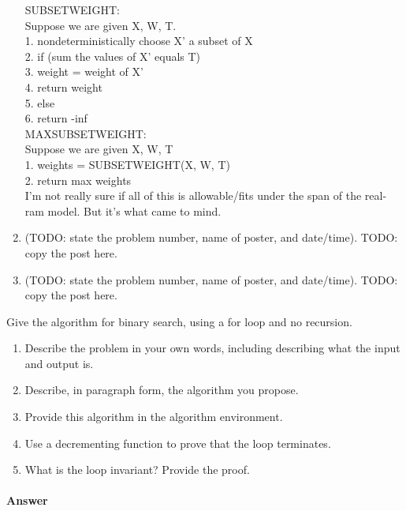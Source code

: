 \documentclass{article}
\begin{document}
\begin{enumerate}
        SUBSETWEIGHT: \\
        Suppose we are given X, W, T.\\
        1. nondeterministically choose X' a subset of X\\
        2. if (sum the values of X' equals T)\\
        3.     weight = weight of X'\\
        4.     return weight\\
        5. else\\
        6.     return -inf\\

        MAXSUBSETWEIGHT:\\
        Suppose we are given X, W, T\\
        1. weights = SUBSETWEIGHT(X, W, T)\\
        2. return max { weights }\\

        I'm not really sure if all of this is allowable/fits under the span of the real-ram model. But it's what came to mind.

    \item (TODO: state the problem number, name of poster, and date/time). TODO:
        copy the post here.
    \item (TODO: state the problem number, name of poster, and date/time). TODO:
        copy the post here.
\end{enumerate}


\nextprob
{}

Give the algorithm for binary search, using a for loop and no recursion.

\begin{enumerate}
    \item Describe the problem in your own words, including describing what the input and output is.
    \item Describe, in paragraph form, the algorithm you propose.
    \item Provide this algorithm in the algorithm environment.
    \item Use a decrementing function to prove that the loop terminates.
    \item What is the loop invariant? Provide the proof.
\end{enumerate}

\paragraph{Answer}
\end{document}
